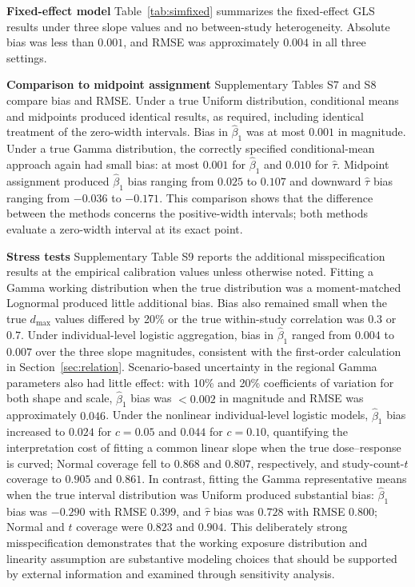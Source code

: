 \documentclass[journal=rsm]{CUP-JNL-DTM}%
\theoremstyle{definition}
\numberwithin{equation}{section}
\begin{document}
\noindent\textbf{Fixed-effect model}
Table~\ref{tab:simfixed} summarizes the fixed-effect GLS results under three
slope values and no between-study heterogeneity. Absolute bias was less than
$0.001$, and RMSE was approximately $0.004$ in all three settings.


\noindent\textbf{Comparison to midpoint assignment}
Supplementary Tables S7 and S8 compare bias and RMSE. Under a true Uniform
distribution, conditional means and midpoints produced identical results, as
required, including identical treatment of the zero-width intervals.
Bias in $\hat\beta_1$ was at most $0.001$ in magnitude. Under a true Gamma
distribution, the correctly specified conditional-mean approach again had
small bias: at most $0.001$ for $\hat\beta_1$ and $0.010$ for $\hat\tau$.
Midpoint assignment produced $\hat\beta_1$ bias ranging from $0.025$ to
$0.107$ and downward $\hat\tau$ bias ranging from $-0.036$ to $-0.171$.
This comparison shows that the difference between the methods concerns the
positive-width intervals; both methods evaluate a zero-width interval at its
exact point.

\noindent\textbf{Stress tests}
Supplementary Table S9 reports the additional misspecification results at
the empirical calibration values unless otherwise noted. Fitting a Gamma
working distribution when the true distribution was a moment-matched
Lognormal produced little additional bias. Bias also remained small when the
true $d_{\max}$ values differed by 20\% or the true within-study correlation
was $0.3$ or $0.7$. Under individual-level logistic aggregation, bias in
$\hat\beta_1$ ranged from $0.004$ to $0.007$ over the three slope magnitudes,
consistent with the first-order calculation in Section~\ref{sec:relation}.
Scenario-based uncertainty in the regional Gamma parameters also had little
effect: with 10\% and 20\% coefficients of variation for both shape and scale,
$\hat\beta_1$ bias was $<0.002$ in magnitude and RMSE was approximately
$0.046$. Under the nonlinear individual-level logistic models,
$\hat\beta_1$ bias increased to $0.024$ for $c=0.05$ and $0.044$ for $c=0.10$,
quantifying the interpretation cost of fitting a common linear slope when the
true dose--response is curved; Normal coverage fell to $0.868$ and $0.807$,
respectively, and study-count-$t$ coverage to $0.905$ and $0.861$. In contrast,
fitting the Gamma representative
means when the true interval distribution was Uniform produced substantial
bias: $\hat\beta_1$ bias was $-0.290$ with RMSE $0.399$, and $\hat\tau$ bias
was $0.728$ with RMSE $0.800$; Normal and $t$ coverage were $0.823$ and $0.904$.
This deliberately strong misspecification demonstrates that the working
exposure distribution and linearity assumption are substantive modeling choices
that should be supported by external information and examined through
sensitivity analysis.
\end{document}
